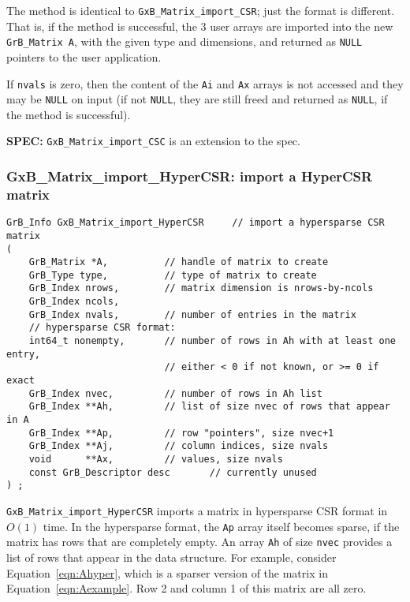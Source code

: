 \documentclass[12pt]{article}
\begin{document}
The method is identical to \verb'GxB_Matrix_import_CSR'; just the format is
different.  That is, if the method is successful, the 3 user arrays are
imported into the new \verb'GrB_Matrix A', with the given type and dimensions,
and returned as \verb'NULL' pointers to the user application.

If \verb'nvals' is zero, then the content of the \verb'Ai' and \verb'Ax' arrays
is not accessed and they may be \verb'NULL' on input (if not \verb'NULL', they
are still freed and returned as \verb'NULL', if the method is successful).

\begin{spec}
{\bf SPEC:} \verb'GxB_Matrix_import_CSC' is an extension to the spec.
\end{spec}

\newpage
\subsubsection{{\sf GxB\_Matrix\_import\_HyperCSR:} import a HyperCSR matrix}
\label{matrix_import_hypercsr}

\begin{mdframed}[userdefinedwidth=6in]
{\footnotesize
\begin{verbatim}
GrB_Info GxB_Matrix_import_HyperCSR     // import a hypersparse CSR matrix
(
    GrB_Matrix *A,          // handle of matrix to create
    GrB_Type type,          // type of matrix to create
    GrB_Index nrows,        // matrix dimension is nrows-by-ncols
    GrB_Index ncols,
    GrB_Index nvals,        // number of entries in the matrix
    // hypersparse CSR format:
    int64_t nonempty,       // number of rows in Ah with at least one entry,
                            // either < 0 if not known, or >= 0 if exact
    GrB_Index nvec,         // number of rows in Ah list
    GrB_Index **Ah,         // list of size nvec of rows that appear in A
    GrB_Index **Ap,         // row "pointers", size nvec+1
    GrB_Index **Aj,         // column indices, size nvals
    void      **Ax,         // values, size nvals
    const GrB_Descriptor desc       // currently unused
) ;
\end{verbatim}
} \end{mdframed}

\verb'GxB_Matrix_import_HyperCSR' imports a matrix in hypersparse CSR format in
$O(1)$ time.  In the hypersparse format, the \verb'Ap' array itself becomes
sparse, if the matrix has rows that are completely empty.  An array \verb'Ah'
of size \verb'nvec' provides a list of rows that appear in the data structure.
For example, consider Equation~\ref{eqn:Ahyper}, which is a sparser version of
the matrix in Equation~\ref{eqn:Aexample}.  Row 2 and column 1 of this matrix
are all zero.
\end{document}
